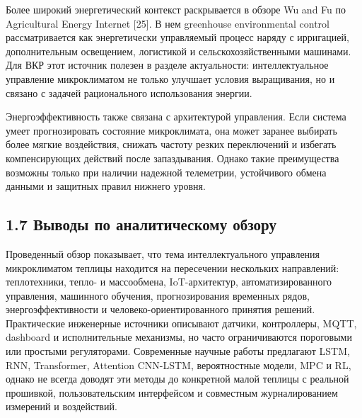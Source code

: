 \documentclass[a4paper,14pt]{extarticle}
\begin{document}
Более широкий энергетический контекст раскрывается в обзоре Wu and Fu по
Agricultural Energy Internet {[}25{]}. В нем greenhouse environmental
control рассматривается как энергетически управляемый процесс наряду с
ирригацией, дополнительным освещением, логистикой и
сельскохозяйственными машинами. Для ВКР этот источник полезен в разделе
актуальности: интеллектуальное управление микроклиматом не только
улучшает условия выращивания, но и связано с задачей рационального
использования энергии.

Энергоэффективность также связана с архитектурой управления. Если
система умеет прогнозировать состояние микроклимата, она может заранее
выбирать более мягкие воздействия, снижать частоту резких переключений и
избегать компенсирующих действий после запаздывания. Однако такие
преимущества возможны только при наличии надежной телеметрии,
устойчивого обмена данными и защитных правил нижнего уровня.

\hypertarget{ux432ux44bux432ux43eux434ux44b-ux43fux43e-ux430ux43dux430ux43bux438ux442ux438ux447ux435ux441ux43aux43eux43cux443-ux43eux431ux437ux43eux440ux443}{%
\subsection{1.7 Выводы по аналитическому
обзору}\label{ux432ux44bux432ux43eux434ux44b-ux43fux43e-ux430ux43dux430ux43bux438ux442ux438ux447ux435ux441ux43aux43eux43cux443-ux43eux431ux437ux43eux440ux443}}

Проведенный обзор показывает, что тема интеллектуального управления
микроклиматом теплицы находится на пересечении нескольких направлений:
теплотехники, тепло- и массообмена, IoT-архитектур, автоматизированного
управления, машинного обучения, прогнозирования временных рядов,
энергоэффективности и человеко-ориентированного принятия решений.
Практические инженерные источники описывают датчики, контроллеры, MQTT,
dashboard и исполнительные механизмы, но часто ограничиваются пороговыми
или простыми регуляторами. Современные научные работы предлагают LSTM,
RNN, Transformer, Attention CNN-LSTM, вероятностные модели, MPC и RL,
однако не всегда доводят эти методы до конкретной малой теплицы с
реальной прошивкой, пользовательским интерфейсом и совместным
журналированием измерений и воздействий.
\end{document}

